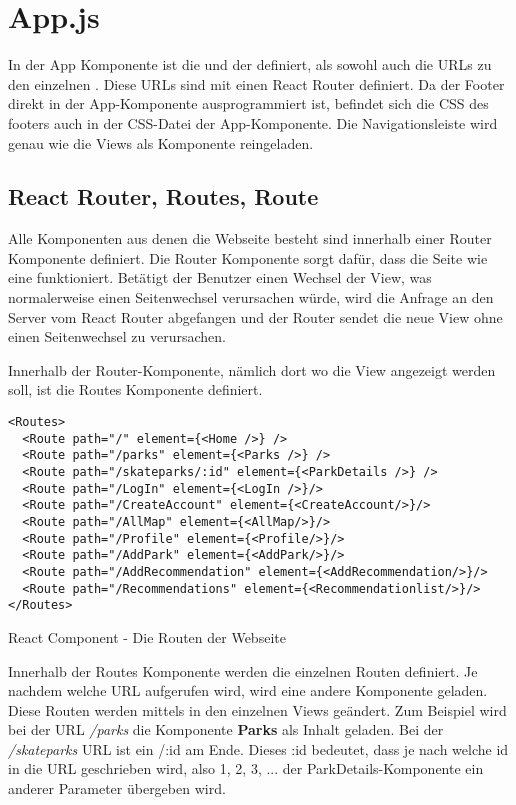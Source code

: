 \section{App.js}
\label{appDatei}

In der App Komponente ist die \underline{} und der \underline{} definiert, 
als sowohl auch die URLs zu den einzelnen \underline{}. Diese URLs sind mit einen React 
Router definiert. Da der Footer direkt in der App-Komponente ausprogrammiert ist, 
befindet sich die CSS des footers auch in der CSS-Datei der App-Komponente. Die Navigationsleiste wird genau 
wie die Views als Komponente reingeladen.

\subsection{React Router, Routes, Route}
Alle Komponenten aus denen die Webseite besteht sind innerhalb einer Router Komponente definiert. Die 
Router Komponente sorgt dafür, dass die Seite wie eine \underline{} funktioniert. Betätigt
der Benutzer einen Wechsel der View, was normalerweise einen Seitenwechsel verursachen würde, wird die 
Anfrage an den Server vom React Router abgefangen und der Router sendet die neue View ohne einen 
Seitenwechsel zu verursachen. 

\newpage
Innerhalb der Router-Komponente, nämlich dort wo die View angezeigt werden soll, ist die Routes
Komponente definiert.
\begin{code}[htp]
\begin{lstlisting}
<Routes>
  <Route path="/" element={<Home />} />
  <Route path="/parks" element={<Parks />} />
  <Route path="/skateparks/:id" element={<ParkDetails />} />
  <Route path="/LogIn" element={<LogIn />}/>
  <Route path="/CreateAccount" element={<CreateAccount/>}/>
  <Route path="/AllMap" element={<AllMap/>}/>
  <Route path="/Profile" element={<Profile/>}/>
  <Route path="/AddPark" element={<AddPark/>}/>
  <Route path="/AddRecommendation" element={<AddRecommendation/>}/>
  <Route path="/Recommendations" element={<Recommendationlist/>}/>
</Routes>
\end{lstlisting} 
\caption{React Component - Die Routen der Webseite}
\end{code}
Innerhalb der Routes Komponente werden die einzelnen Routen definiert. Je nachdem welche URL aufgerufen wird,
wird eine andere Komponente geladen. Diese Routen werden mittels \underline{} in den einzelnen 
Views geändert. Zum Beispiel wird bei der URL \textit{/parks} die Komponente \textbf{Parks} als 
Inhalt geladen. Bei der \textit{/skateparks} URL ist ein /:id am Ende. Dieses :id 
bedeutet, dass je nach welche id in die URL geschrieben wird, also 1, 2, 3, ... der 
ParkDetails-Komponente ein anderer Parameter übergeben wird. 

